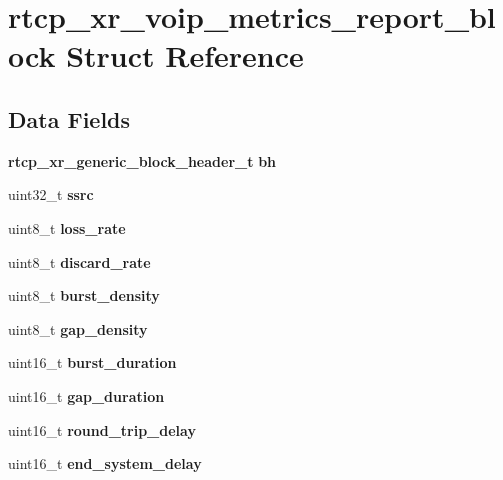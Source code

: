 \section{rtcp\+\_\+xr\+\_\+voip\+\_\+metrics\+\_\+report\+\_\+block Struct Reference}
\label{structrtcp__xr__voip__metrics__report__block}
\subsection*{Data Fields}
\begin{DoxyCompactItemize}
\item 
\mbox{\label{structrtcp__xr__voip__metrics__report__block_af273aa72ab0199812d4509ef5c72d822}} 
\textbf{ rtcp\+\_\+xr\+\_\+generic\+\_\+block\+\_\+header\+\_\+t} {\bfseries bh}
\item 
\mbox{\label{structrtcp__xr__voip__metrics__report__block_afe8288ca230b3a71ec7276b4dfd2be1e}} 
uint32\+\_\+t {\bfseries ssrc}
\item 
\mbox{\label{structrtcp__xr__voip__metrics__report__block_a1592cccd7b1074336c1b3e1a90be1400}} 
uint8\+\_\+t {\bfseries loss\+\_\+rate}
\item 
\mbox{\label{structrtcp__xr__voip__metrics__report__block_af60aee4ea88ca7df4c43d0f422f36253}} 
uint8\+\_\+t {\bfseries discard\+\_\+rate}
\item 
\mbox{\label{structrtcp__xr__voip__metrics__report__block_a54dabc219ac14b03cf009ac250f48d4a}} 
uint8\+\_\+t {\bfseries burst\+\_\+density}
\item 
\mbox{\label{structrtcp__xr__voip__metrics__report__block_a37d9d28e65c9566cdb69d8f83e44b4fa}} 
uint8\+\_\+t {\bfseries gap\+\_\+density}
\item 
\mbox{\label{structrtcp__xr__voip__metrics__report__block_aeb469347967ae6db6db7817a924fd804}} 
uint16\+\_\+t {\bfseries burst\+\_\+duration}
\item 
\mbox{\label{structrtcp__xr__voip__metrics__report__block_a9dc854bac950e4f6701f32f634cc57d0}} 
uint16\+\_\+t {\bfseries gap\+\_\+duration}
\item 
\mbox{\label{structrtcp__xr__voip__metrics__report__block_af43a2b601f3b2bc10a58a39007c79616}} 
uint16\+\_\+t {\bfseries round\+\_\+trip\+\_\+delay}
\item 
\mbox{\label{structrtcp__xr__voip__metrics__report__block_a2ff932cd6a1d9eae6fd811b3010ff635}} 
uint16\+\_\+t {\bfseries end\+\_\+system\+\_\+delay}
\item 

\end{DoxyCompactItemize}
